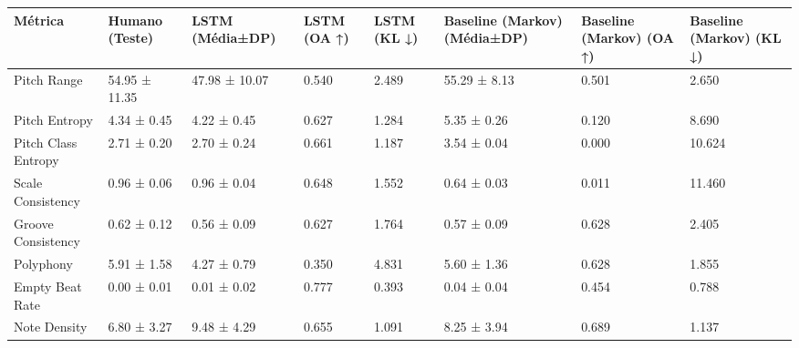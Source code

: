 \begin{tabular}{llllllll}
\toprule
Métrica & Humano (Teste) & LSTM (Média±DP) & LSTM (OA ↑) & LSTM (KL ↓) & Baseline (Markov) (Média±DP) & Baseline (Markov) (OA ↑) & Baseline (Markov) (KL ↓) \\
\midrule
Pitch Range & 54.95 ± 11.35 & 47.98 ± 10.07 & 0.540 & 2.489 & 55.29 ± 8.13 & 0.501 & 2.650 \\
Pitch Entropy & 4.34 ± 0.45 & 4.22 ± 0.45 & 0.627 & 1.284 & 5.35 ± 0.26 & 0.120 & 8.690 \\
Pitch Class Entropy & 2.71 ± 0.20 & 2.70 ± 0.24 & 0.661 & 1.187 & 3.54 ± 0.04 & 0.000 & 10.624 \\
Scale Consistency & 0.96 ± 0.06 & 0.96 ± 0.04 & 0.648 & 1.552 & 0.64 ± 0.03 & 0.011 & 11.460 \\
Groove Consistency & 0.62 ± 0.12 & 0.56 ± 0.09 & 0.627 & 1.764 & 0.57 ± 0.09 & 0.628 & 2.405 \\
Polyphony & 5.91 ± 1.58 & 4.27 ± 0.79 & 0.350 & 4.831 & 5.60 ± 1.36 & 0.628 & 1.855 \\
Empty Beat Rate & 0.00 ± 0.01 & 0.01 ± 0.02 & 0.777 & 0.393 & 0.04 ± 0.04 & 0.454 & 0.788 \\
Note Density & 6.80 ± 3.27 & 9.48 ± 4.29 & 0.655 & 1.091 & 8.25 ± 3.94 & 0.689 & 1.137 \\
\bottomrule
\end{tabular}
